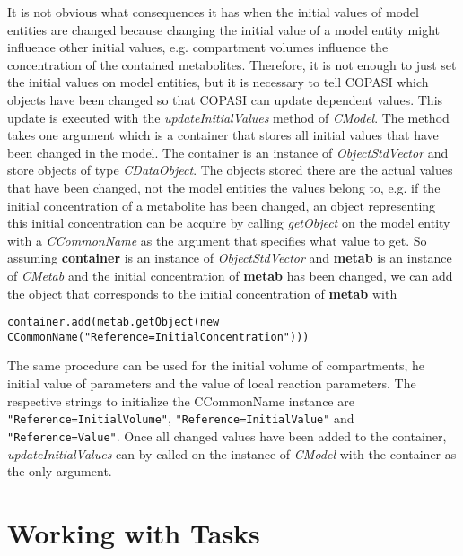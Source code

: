 \documentclass[a4,10pt]{article}
\begin{document}
It is not obvious what consequences it has when the initial values of model entities are changed because changing the initial value of a model entity might influence other initial values, e.g. compartment volumes influence the concentration of the contained metabolites.
Therefore, it is not enough to just set the initial values on model entities, but it is necessary to tell COPASI which objects have been changed so that COPASI can update dependent values.
This update is executed with the \textit{updateInitialValues} method of \textit{CModel}. The method takes one argument which is a container that stores all initial values that have been changed in the model. The container is an instance of \textit{ObjectStdVector} and store objects of type \textit{CDataObject}. The objects stored there are the actual values that have been changed, not the model entities the values belong to, e.g. if the initial concentration of a metabolite has been changed, an object representing this initial concentration can be acquire by calling \textit{getObject} on the model entity with a \textit{CCommonName} as the argument that specifies what value to get.
So assuming \textbf{container} is an instance of \textit{ObjectStdVector} and \textbf{metab} is an instance of \textit{CMetab} and the initial concentration of \textbf{metab} has been changed, we can add the object that corresponds to the initial concentration of \textbf{metab} with
\small{
\begin{verbatim}
container.add(metab.getObject(new CCommonName("Reference=InitialConcentration")))
\end{verbatim}
}
The same procedure can be used for the initial volume of compartments, he initial value of parameters and the value of local reaction parameters. The respective strings to initialize the CCommonName instance are \verb$"Reference=InitialVolume"$, \verb$"Reference=InitialValue"$ and \verb$"Reference=Value"$.
Once all changed values have been added to the container, \textit{updateInitialValues} can by called on the instance of \textit{CModel} with the container as the only argument. 



\section{Working with Tasks}
\end{document}
